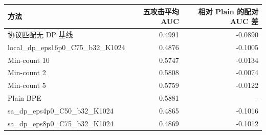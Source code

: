 \begin{tabular}{lrr}
\toprule
方法 & 五攻击平均 AUC & 相对 Plain 的配对 AUC 差 \\
\midrule
协议匹配无 DP 基线 & 0.4991 & -0.0890 \\
local\_dp\_eps16p0\_C75\_b32\_K1024 & 0.4876 & -0.1005 \\
Min-count 10 & 0.5747 & -0.0134 \\
Min-count 2 & 0.5808 & -0.0074 \\
Min-count 5 & 0.5759 & -0.0122 \\
Plain BPE & 0.5881 & -- \\
sa\_dp\_eps4p0\_C50\_b32\_K1024 & 0.4865 & -0.1016 \\
sa\_dp\_eps8p0\_C75\_b32\_K1024 & 0.4869 & -0.1012 \\
\bottomrule
\end{tabular}
